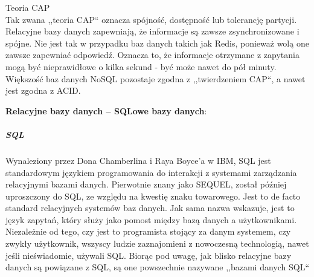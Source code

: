 \documentclass[12pt, a4paper, twoside, openany]{book}
\begin{document}
Teoria CAP \\
Tak zwana ,,teoria CAP`` oznacza spójność, dostępność lub tolerancję partycji. Relacyjne bazy danych zapewniają, że informacje są zawsze zsynchronizowane i spójne. Nie jest tak w przypadku baz danych takich jak Redis, ponieważ wolą one zawsze zapewniać odpowiedź. Oznacza to, że informacje otrzymane z zapytania mogą być nieprawidłowe o kilka sekund - być może nawet do pół minuty. Większość baz danych NoSQL pozostaje zgodna z ,,twierdzeniem CAP``, a nawet jest zgodna z ACID.

\textbf{Relacyjne bazy danych -- SQLowe bazy danych}:\\
\subparagraph*{SQL\\}
Wynaleziony przez Dona Chamberlina i Raya Boyce'a w IBM, SQL jest standardowym językiem programowania do interakcji z systemami zarządzania relacyjnymi bazami danych. Pierwotnie znany jako SEQUEL, został później uproszczony do SQL, ze względu na kwestię znaku towarowego. Jest to de facto standard relacyjnych systemów baz danych. Jak sama nazwa wskazuje, jest to język zapytań, który służy jako pomost między bazą danych a użytkownikami. Niezależnie od tego, czy jest to programista stojący za danym systemem, czy zwykły użytkownik, wszyscy ludzie zaznajomieni z nowoczesną technologią, nawet jeśli nieświadomie, używali SQL. Biorąc pod uwagę, jak blisko relacyjne bazy danych są powiązane z SQL, są one powszechnie nazywane ,,bazami danych SQL``
\end{document}
